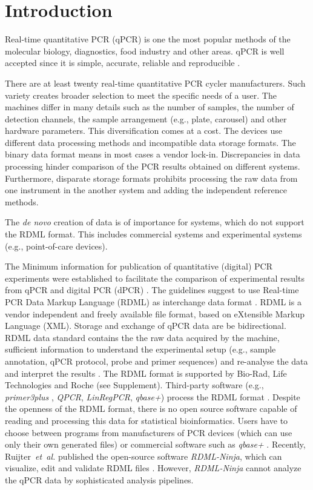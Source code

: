 \documentclass{bioinfo}
\begin{document}
	\section{Introduction}
	
	Real-time quantitative PCR (qPCR) is one the most popular methods of the 
	molecular biology, diagnostics, food industry and other areas. qPCR is well 
	accepted since it is simple, accurate, reliable and reproducible \cite{pabinger_2014}.
	
	There are at least twenty real-time quantitative PCR cycler 
	manufacturers. Such variety creates broader selection 
	to meet the specific needs of a user. The machines differ in many details such 
	as the number of samples, the number of detection channels, the sample 
	arrangement (e.g., plate, carousel) and other hardware parameters. This 
	diversification comes at a cost. The devices use different data processing 
	methods and incompatible data storage formats. The binary data format means in 
	most cases a vendor lock-in. Discrepancies in data processing hinder comparison 
	of the PCR results obtained on different systems. Furthermore, disparate storage 
	formats prohibits processing the raw data from one instrument in the another 
	system and adding the independent reference methods.
	
	The \textit{de novo} creation of data is of importance for systems, which do 
	not support the RDML format. This includes commercial systems and experimental 
	systems (e.g.,  point-of-care devices).
	
	The Minimum information for publication of quantitative (digital) PCR 
	experiments  were established to facilitate the comparison of experimental 
	results from qPCR and digital PCR (dPCR) \cite{huggett_2013}. The guidelines 
	suggest to use Real-time PCR Data Markup Language (RDML) as interchange data 
	format \cite{rdml-ninja_2015}. RDML is a vendor independent and freely available 
	file format, based on eXtensible Markup Language (XML). Storage and exchange of 
	qPCR data are be bidirectional. RDML data standard contains the the raw data 
	acquired by the machine, sufficient information to understand the experimental 
	setup (e.g., sample annotation, qPCR protocol, probe and primer sequences) and 
	re-analyse the data and interpret the results \cite{lefever_rdml_2009}. The RDML 
	format is supported by Bio-Rad, Life Technologies and Roche (see Supplement). 
	Third-party software (e.g., \textit{primer3plus} \cite{untergasser_2007}, \textit{QPCR}, 
	\textit{LinRegPCR}, \textit{qbase+}) process the RDML format \cite{pabinger_2014, 
	rdml-ninja_2015}. Despite the openness of the RDML format, there is no open source 
	software capable of reading and processing this data for statistical 
	bioinformatics. Users have to choose between programs from manufacturers of PCR 
	devices (which can use only their own generated files) or commercial software 
	such as \textit{qbase+} \cite{pabinger_2014, rdml-ninja_2015}. Recently, 
	Ruijter~\textit{et~al.} published the open-source software \textit{RDML-Ninja}, 
	which can visualize, edit and validate RDML files \cite{rdml-ninja_2015}. 
	However, \textit{RDML-Ninja} cannot analyze the qPCR data by sophisticated 
	analysis pipelines. 
	
\end{document}
